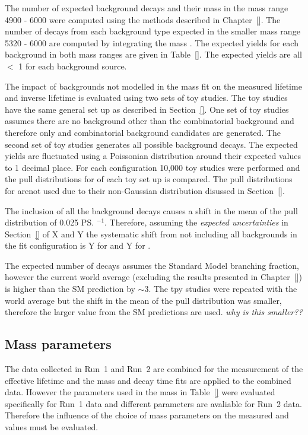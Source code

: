 The number of expected background decays and their mass \pdfs in the mass range 4900 - 6000 \mevcc were computed using the methods described in Chapter~\ref{}. The number of decays from each background type expected in the smaller mass range 5320 - 6000 \mevcc are computed by integrating the mass \pdfs. The expected yields for each background in both mass ranges are given in Table~\ref{}. The expected yields are all $<$ 1 for each background source. 

The impact of backgrounds not modelled in the mass fit on the measured lifetime and inverse lifetime is evaluated using two sets of toy studies. The toy studies have the same general set up as described in Section~\ref{}. One set of toy studies assumes there are no background other than the combinatorial background and therefore only \bsmumu and combinatorial background candidates are generated. The second set of toy studies generates all possible background decays. The expected yields are fluctuated using a Poissonian distribution around their expected values to 1 decimal place. For each configuration 10,000 toy studies were performed and the pull distributions for \Gmumu of each toy set up is compared. The pull distributions for \tmumu arenot used due to their non-Gaussian distribution disussed in Section~\ref{}. 

The inclusion of all the background decays causes a shift in the mean of the \Gmumu pull distribution of 0.025 \ps$^{-1}$. Therefore, assuming the {\it expected uncertainties} in Section~\ref{} of X and Y the systematic shift from not including all backgrounds in the fit configuration is Y for \tmumu and Y for \Gmumu. 

The expected number of \bdmumu decays assumes the Standard Model branching fraction, however the current world average (excluding the results presented in Chapter~\ref{}) is higher than the SM prediction by $\sim 3$. The tpy studies were repeated with the world average but the shift in the mean of the pull distribution was smaller, therefore the larger value from the SM predictions are used. {\it why is this smaller??}

\subsection{Mass \pdf parameters}
\label{sec:massPDFsyst}
The data collected in Run~1 and Run~2 are combined for the measurement of the \bsmumu effective lifetime and the mass and decay time fits are applied to the combined data. However the parameters used in the mass \pdf in Table~\ref{} were evaluated specifically for Run~1 data and different parameters are avaliable for Run~2 data. Therefore the influence of the choice of mass \pdf parameters on the measured \tmumu and \Gmumu values must be evaluated. 

